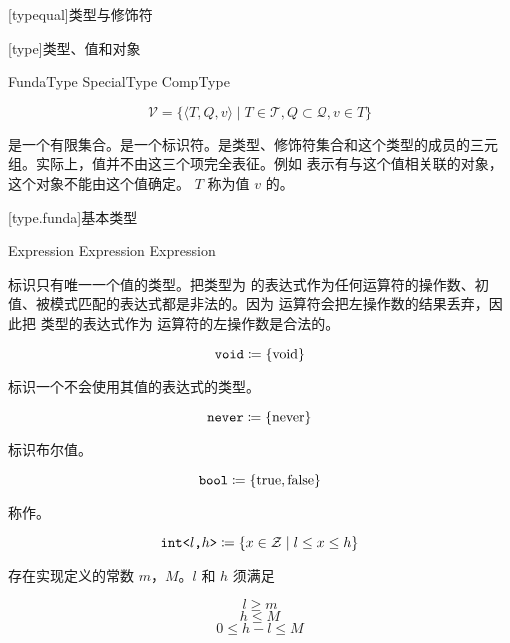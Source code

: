 
[typequal]{类型与修饰符}

[type]{类型、值和对象}

\begin{bnf}
 \br
    FundaType \br
    SpecialType \br
    CompType
\end{bnf}

$$ \mathcal{V} = \{ \langle T, Q, v \rangle \mid T \in \mathcal{T}, Q \subset \mathcal{Q}, v \in T \} $$

\pnum
{}是一个有限集合。是一个标识符。是类型、修饰符集合和这个类型的成员的三元组。\enternote 实际上，值并不由这三个项完全表征。例如  表示有与这个值相关联的对象，这个对象不能由这个值确定。 \exitnote $T$ 称为值 $v$ 的。

[type.funda]{基本类型}

\begin{bnf}
 \br
     \br
     \br
     \br
     \br
     \br
     \terminal{<} Expression \terminal{,} Expression \terminal{>} \br
     \br
     \terminal{<} Expression \terminal{>} \br
\end{bnf}

\pnum
{} 标识只有唯一一个值的类型。把类型为  的表达式作为任何运算符的操作数、初值、被模式匹配的表达式都是非法的。\enternote 因为 \tcode{;} 运算符会把左操作数的结果丢弃，因此把  类型的表达式作为 \tcode{;} 运算符的左操作数是合法的。\exitnote

$$\texttt{void} \coloneqq \{ \mathrm{void} \}$$

\pnum
{} 标识一个不会使用其值的表达式的类型。

$$\texttt{never} \coloneqq \{ \mathrm{never} \}$$

\pnum
{} 标识布尔值。

$$\texttt{bool} \coloneqq \{ \mathrm{true}, \mathrm{false} \}$$

\pnum
{} 称作。

$$\texttt{int<}l\texttt{,}h\texttt{>} \coloneqq \{ x \in \mathcal{Z} \mid l \le x \le h \}$$

存在实现定义的常数 $m$，$M$。$l$ 和 $h$ 须满足

$$ l \ge m $$
$$ h \le M $$
$$ 0 \le h - l \le M $$

